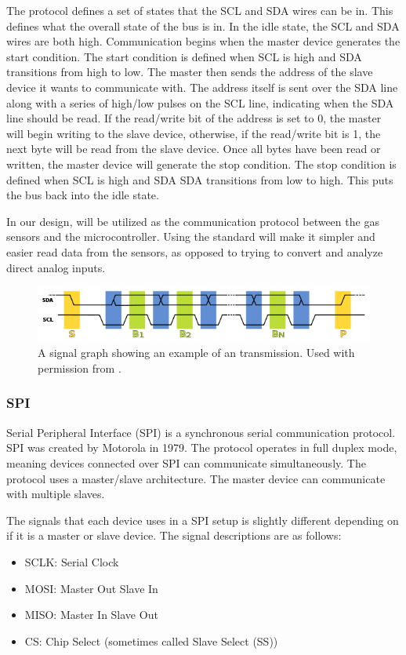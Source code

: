 The \iic protocol defines a set of states that the SCL and SDA wires can be in. This defines what the overall state of the \iic bus is in. In the idle state, the SCL and SDA wires are both high. Communication begins when the master device generates the start condition. The start condition is defined when SCL is high and SDA transitions from high to low. The master then sends the address of the slave device it wants to communicate with. The address itself is sent over the SDA line along with a series of high/low pulses on the SCL line, indicating when the SDA line should be read. If the read/write bit of the address is set to 0, the master will begin writing to the slave device, otherwise, if the read/write bit is 1, the next byte will be read from the slave device. Once all bytes have been read or written, the master device will generate the stop condition. The stop condition is defined when SCL is high and SDA SDA transitions from low to high. This puts the bus back into the idle state.

In our design, \iic will be utilized as the communication protocol between the gas sensors and the microcontroller. Using the \iic standard will make it simpler and easier read data from the sensors, as opposed to trying to convert and analyze direct analog inputs.

\begin{figure}
    \centering
    \includegraphics[width=6in]{figures/i2c-protocol.png}
    \caption{A signal graph showing an example of an \iic transmission. Used with permission from \cite{i2c-protocol}.}
    \label{fig:uart-data-packet}
\end{figure}

\subsubsection{SPI}
Serial Peripheral Interface (SPI) is a synchronous serial communication protocol. SPI was created by Motorola in 1979. The protocol operates in full duplex mode, meaning devices connected over SPI can communicate simultaneously. The protocol uses a master/slave architecture. The master device can communicate with multiple slaves.

The signals that each device uses in a SPI setup is slightly different depending on if it is a master or slave device. The signal descriptions are as follows:
\begin{itemize}
    \item SCLK: Serial Clock
    \item MOSI: Master Out Slave In
    \item MISO: Master In Slave Out
    \item CS: Chip Select (sometimes called Slave Select (SS))
\end{itemize}

